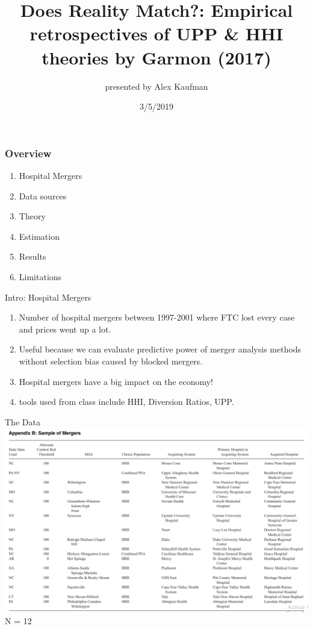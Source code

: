 \documentclass{beamer}
\title{Does Reality Match?: Empirical retrospectives of UPP \& HHI theories by Garmon (2017) }
\author{presented by Alex Kaufman}
\institute{WWS Legal and Regulatory Policy}
\date{3/5/2019}
\begin{document}
\frame{\titlepage}
 
\begin{frame}
\frametitle{Overview}
\begin{enumerate}
    \item Hospital Mergers
    \item Data sources
    \item Theory
    \item Estimation
    \item Results
    \item Limitations

\end{enumerate}
\end{frame}


\begin{frame}{Intro: Hospital Mergers}

    \begin{enumerate}
        \item Number of hospital mergers between 1997-2001 where FTC lost every case and prices went up a lot.
        \item Useful because we can evaluate predictive power of merger analysis methods without selection bias caused by blocked mergers.
        \item Hospital mergers have a big impact on the economy!
        \item tools used from class include HHI, Diversion Ratios, UPP.
    \end{enumerate}
\end{frame}

\begin{frame}{The Data}
            \includegraphics[width=\linewidth,height=\textheight,keepaspectratio]{data.PNG} \\
            N = 12
\end{frame}
\end{document}

